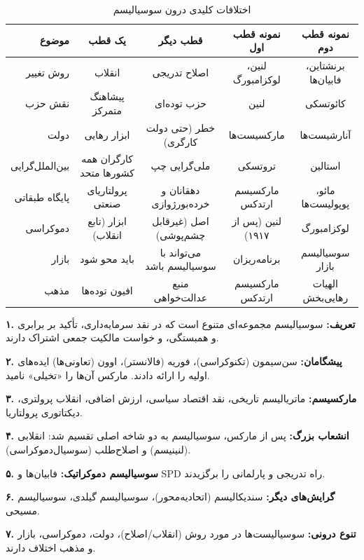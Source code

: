 \begin{table}[htbp]
\centering
\caption{اختلافات کلیدی درون سوسیالیسم}
\label{tab:socialism-debates}
\small
\begin{tabular}{r|c|c|c|c}
\toprule
\textbf{موضوع} & \textbf{یک قطب} & \textbf{قطب دیگر} & \textbf{نمونه قطب اول} & \textbf{نمونه قطب دوم} \\
\midrule
روش تغییر & انقلاب & اصلاح تدریجی & لنین، لوکزامبورگ & برنشتاین، فابیان‌ها \\
\midrule
نقش حزب & پیشاهنگ متمرکز & حزب توده‌ای & لنین & کائوتسکی \\
\midrule
دولت & ابزار رهایی & خطر (حتی دولت کارگری) & مارکسیست‌ها & آنارشیست‌ها \\
\midrule
بین‌الملل‌گرایی & کارگران همه کشورها متحد & ملی‌گرایی چپ & تروتسکی & استالین \\
\midrule
پایگاه طبقاتی & پرولتاریای صنعتی & دهقانان و خرده‌بورژوازی & مارکسیسم ارتدکس & مائو، پوپولیست‌ها \\
\midrule
دموکراسی & ابزار (تابع انقلاب) & اصل (غیرقابل چشم‌پوشی) & لنین (پس از ۱۹۱۷) & لوکزامبورگ \\
\midrule
بازار & باید محو شود & می‌تواند با سوسیالیسم باشد & برنامه‌ریزان & سوسیالیسم بازار \\
\midrule
مذهب & افیون توده‌ها & منبع عدالت‌خواهی & مارکسیسم ارتدکس & الهیات رهایی‌بخش \\
\bottomrule
\end{tabular}
\end{table}


\newpage

\begin{summarybox}

\textbf{۱. تعریف:} سوسیالیسم مجموعه‌ای متنوع است که در نقد سرمایه‌داری، تأکید بر برابری و همبستگی، و خواست مالکیت جمعی اشتراک دارند.

\textbf{۲. پیشگامان:} سن‌سیمون (تکنوکراسی)، فوریه (فالانستر)، اوون (تعاونی‌ها) ایده‌های اولیه را ارائه دادند. مارکس آن‌ها را «تخیلی» نامید.

\textbf{۳. مارکسیسم:} ماتریالیسم تاریخی، نقد اقتصاد سیاسی، ارزش اضافی، انقلاب پرولتری، دیکتاتوری پرولتاریا.

\textbf{۴. انشعاب بزرگ:} پس از مارکس، سوسیالیسم به دو شاخه اصلی تقسیم شد: انقلابی (لنینیسم) و اصلاح‌طلب (سوسیال‌دموکراسی).

\textbf{۵. سوسیالیسم دموکراتیک:} فابیان‌ها و SPD راه تدریجی و پارلمانی را برگزیدند.

\textbf{۶. گرایش‌های دیگر:} سندیکالیسم (اتحادیه‌محور)، سوسیالیسم گیلدی، سوسیالیسم مسیحی.

\textbf{۷. تنوع درونی:} سوسیالیست‌ها در مورد روش (انقلاب/اصلاح)، دولت، دموکراسی، بازار و مذهب اختلاف دارند.

\end{summarybox}

